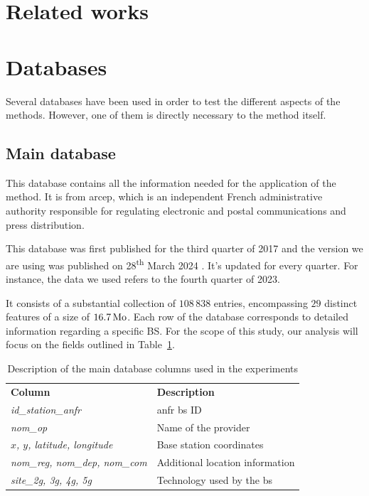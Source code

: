 \documentclass[lettersize,journal,english]{IEEEtran}
\begin{document}
\section{Related works\label{sec:rel_works}}
    \noindent

\section{Databases\label{sec:data}}
    \noindent Several databases have been used in order to test the different aspects of the methods. However, one of them is directly necessary to the method itself.

    \subsection{Main database}
        This database \cite{main_database} contains all the information needed for the application of the method. It is from \acrfull{arcep}, which is an independent French administrative authority responsible for regulating electronic and postal communications and press distribution.

        This database was first published for the third quarter of 2017 and the version we are using was published on 28\textsuperscript{th} March 2024 \cite{main_database_hist}.
        It's updated for every quarter. For instance, the data we used refers to the fourth quarter of 2023.

        It consists of a substantial collection of $108\,838$ entries, encompassing $29$ distinct features of a size of $\unit[16.7]{Mo}$.
        Each row of the database corresponds to detailed information regarding a specific BS. For the scope of this study, our analysis will focus on the fields outlined in Table~\ref{table:data_columns}.
        \begin{table}
            \centering
            \caption{Description of the main database columns used in the experiments}
            \label{table:data_columns}
            \begin{tabular}{ll}
                \toprule
                \textbf{Column} & \textbf{Description} \\
                \cmidrule(lr){1-2}
                \textsl{id\_station\_anfr} & \acrshort{anfr} \acrshort{bs} ID \\ 
                \textsl{nom\_op} & Name of the provider \\
                \textsl{$x$, $y$, latitude, longitude} & Base station coordinates \\ 
                \textsl{nom\_reg, nom\_dep, nom\_com} & Additional location information \\  
                \textsl{site\_2g, 3g, 4g, 5g} & Technology used by the \acrshort{bs} \\ 
                \bottomrule
            \end{tabular}
        \end{table}
\end{document}
